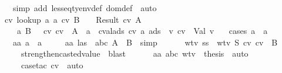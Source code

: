 \begin{isabellebody}
\ \ \ \ \isamarkupfalse \ {\isacharparenleft}simp\ add{\isacharcolon}\ lesseq{\isacharunderscore}tyenv{\isacharunderscore}def\ dom{\isacharunderscore}def{\isacharparenright}\ \isamarkupfalse \ auto\ \isamarkupfalse \isanewline
\ \ \isamarkupfalse \ {\isachardoublequoteopen}{\isasymexists}cv{\isacharprime}{\isachardot}\ lookup\ a{\isacharprime}\ {\isacharparenleft}{\isacharparenleft}a{\isacharcomma}\ cv{\isacharcomma}\ B{\isacharparenright}\ {\isacharhash}\ {\isasymmu}{\isacharparenright}\ {\isacharequal}\ Result\ {\isacharparenleft}cv{\isacharprime}{\isacharcomma}\ A{\isacharprime}{\isacharparenright}\ {\isasymand}\isanewline
\ \ \ \ \ \ {\isacharparenleft}a{\isacharcomma}\ B{\isacharparenright}\ {\isacharhash}\ {\isasymSigma}\ {\isasymturnstile}cv\ cv{\isacharprime}\ {\isacharcolon}\ A{\isacharprime}\ {\isasymand}\ {\isacharparenleft}a{\isacharprime}\ {\isasymnotin}\ cval{\isacharunderscore}ads\ cv\ a\ ads\ {\isasymlongrightarrow}\ {\isacharparenleft}{\isasymexists}v{\isachardot}\ cv{\isacharprime}\ {\isacharequal}\ Val\ v{\isacharparenright}{\isacharparenright}{\isachardoublequoteclose}\isanewline
\ \ \isamarkupfalse \ {\isacharparenleft}cases\ {\isachardoublequoteopen}a{\isacharprime}\ {\isacharequal}\ a{\isachardoublequoteclose}{\isacharparenright}\isanewline
\ \ \ \ \isamarkupfalse \ aa{\isacharcolon}\ {\isachardoublequoteopen}a{\isacharprime}\ {\isacharequal}\ a{\isachardoublequoteclose}\isanewline
\ \ \ \ \isamarkupfalse \ aa\ las{}\ \isamarkupfalse \ abc{\isacharcolon}\ {\isachardoublequoteopen}A{\isacharprime}\ {\isacharequal}\ B{\isachardoublequoteclose}\ \isamarkupfalse \ simp\ \isamarkupfalse \isanewline
\ \ \ \ \isamarkupfalse \ wtv\ ss\ \isamarkupfalse \ wtv{}{\isacharcolon}\ {\isachardoublequoteopen}{\isacharquery}S{}\ {\isasymturnstile}cv\ cv\ {\isacharcolon}\ B{\isachardoublequoteclose}\ \isanewline
\ \ \ \ \ \ \isamarkupfalse \ strengthen{\isacharunderscore}casted{\isacharunderscore}value\ \isamarkupfalse \ blast\ \isamarkupfalse \isanewline
\ \ \ \ \isamarkupfalse \ aa\ abc\ wtv{}\ \isamarkupfalse \ {\isacharquery}thesis\ \isamarkupfalse \ auto\ \isanewline
\ \ \ \ \ \ \isamarkupfalse \ {\isacharparenleft}case{\isacharunderscore}tac\ cv{\isacharparenright}\ \isamarkupfalse \ auto\ \isamarkupfalse \ \isanewline

\end{isabellebody}
